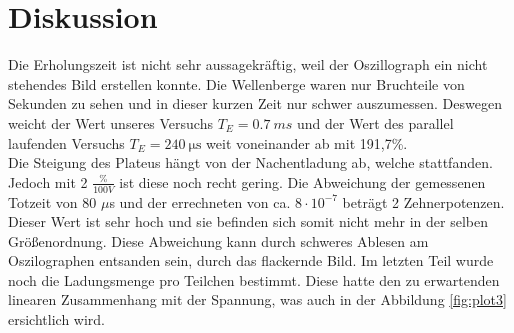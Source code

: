 \section{Diskussion}
\label{sec:Diskussion}
Die Erholungszeit ist nicht sehr aussagekräftig, weil der Oszillograph ein nicht stehendes Bild erstellen konnte.
Die Wellenberge waren nur Bruchteile von Sekunden zu sehen und in dieser kurzen Zeit nur schwer auszumessen.
Deswegen weicht der Wert unseres Versuchs $T_E=\SI{0.7}{ms}$ und der Wert des parallel laufenden Versuchs $T_E=\SI{240}{\micro\second}$ weit voneinander ab mit 191,7\%. \\
Die Steigung des Plateus hängt von der Nachentladung ab, welche stattfanden.
Jedoch mit 2 $\frac{\%}{100V}$ ist diese noch recht gering.
Die Abweichung der gemessenen Totzeit von 80 $\mu$s und der errechneten von ca. $8 \cdot 10^{-7}$ beträgt 2 Zehnerpotenzen.
Dieser Wert ist sehr hoch und sie befinden sich somit nicht mehr in der selben Größenordnung.
Diese Abweichung kann durch schweres Ablesen am Oszilographen entsanden sein, durch das flackernde Bild.
Im letzten Teil wurde noch die Ladungsmenge pro Teilchen bestimmt.
Diese hatte den zu erwartenden linearen Zusammenhang mit der Spannung, was auch in der Abbildung \ref{fig:plot3} ersichtlich wird.